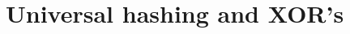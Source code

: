 \documentclass{svproc}
\def\asp{\textsf{\#ASP}\xspace}
\newcommand{\XOR}{\textsc{xor}} %
\newcommand{\fff}{\ensuremath{\Pi}\xspace}
\newcommand{\sol}{$Sol(\Pi)$\xspace}
\newcommand{\sysfont}{\textit}
\newcommand{\xorro}{\sysfont{xorro}}
\begin{document}




%

\section{Universal hashing and XOR's} \label{sec:hashing}
%
\end{document}
